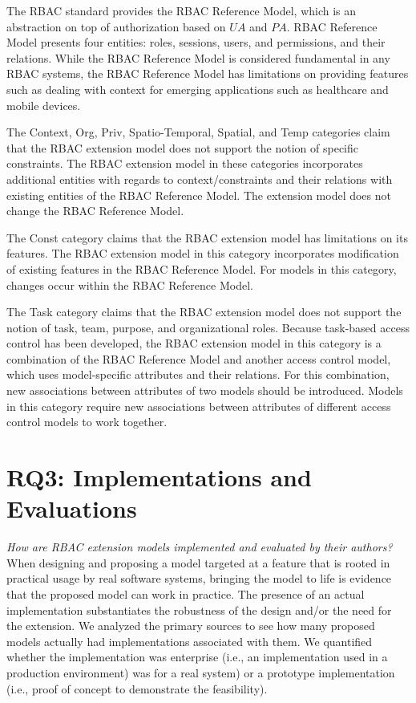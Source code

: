 The RBAC standard provides the RBAC Reference Model, which is an abstraction on top of authorization based on $UA$ and $PA$. RBAC Reference Model presents four entities: roles, sessions, users, and permissions, and their relations. While the RBAC Reference Model is considered fundamental in any RBAC systems, the RBAC Reference Model has limitations on providing features such as dealing with context for emerging applications such as healthcare and mobile devices. 

The Context, Org, Priv, Spatio-Temporal, Spatial, and Temp categories claim that the RBAC extension model does not support the notion of specific constraints. The RBAC extension model in these categories incorporates additional entities with regards to context/constraints and their relations with existing entities of the RBAC Reference Model. The extension model does not change the RBAC Reference Model.

The Const category claims that the RBAC extension model has limitations on its features. The RBAC extension model in this category incorporates modification of existing features in the RBAC Reference Model. For models in this category, changes occur within the RBAC Reference Model.

The Task category claims that the RBAC extension model does not support the notion of task, team, purpose, and organizational roles. Because task-based access control has been developed, the RBAC extension model in this category is a combination of the RBAC Reference Model and another access control model, which uses model-specific attributes and their relations. For this combination, new associations between attributes of two models should be introduced. Models in this category require new associations between attributes of different access control models to work together.


\section{RQ3: Implementations and Evaluations} \label{sec:implementations}

\textit{How are RBAC extension models implemented and evaluated by their authors?}
\\

When designing and proposing a model targeted at a feature that is rooted in practical
usage by real software systems, bringing the model to life is evidence that the
proposed model can work in practice. The presence of an actual implementation substantiates the robustness of the design and/or the need for the extension.
We analyzed the primary sources to see how many
proposed models actually had implementations associated with them.
We quantified whether the implementation was enterprise (i.e., an implementation used in a production environment) was for a real system) or a prototype implementation (i.e., proof of concept to demonstrate the feasibility).

